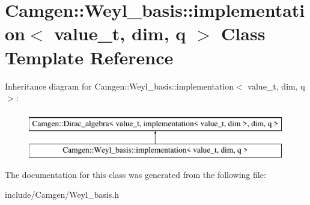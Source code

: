 \hypertarget{a00289}{\section{Camgen\-:\-:Weyl\-\_\-basis\-:\-:implementation$<$ value\-\_\-t, dim, q $>$ Class Template Reference}
\label{a00289}
}
Inheritance diagram for Camgen\-:\-:Weyl\-\_\-basis\-:\-:implementation$<$ value\-\_\-t, dim, q $>$\-:\begin{figure}[H]
\begin{center}
\leavevmode
\includegraphics[height=2.000000cm]{a00289}
\end{center}
\end{figure}


The documentation for this class was generated from the following file\-:\begin{DoxyCompactItemize}
\item 
include/\-Camgen/Weyl\-\_\-basis.\-h\end{DoxyCompactItemize}

